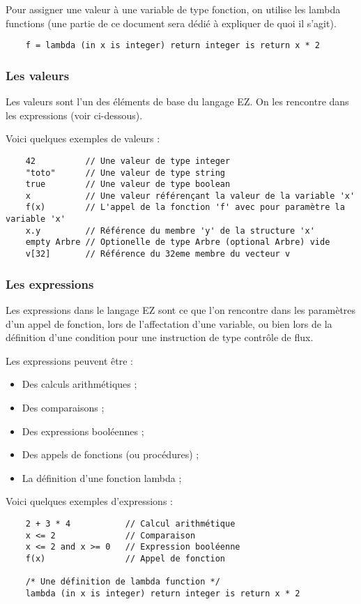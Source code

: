 Pour assigner une valeur à une variable de type fonction, on utilise les lambda
functions (une partie de ce document sera dédié à expliquer de quoi il s'agit).
\begin{verbatim}
    f = lambda (in x is integer) return integer is return x * 2
\end{verbatim}


\subsubsection{Les valeurs}

Les valeurs sont l'un des éléments de base du langage EZ. On les rencontre
dans les expressions (voir ci-dessous).

Voici quelques exemples de valeurs :
\begin{verbatim}
    42          // Une valeur de type integer
    "toto"      // Une valeur de type string
    true        // Une valeur de type boolean
    x           // Une valeur référençant la valeur de la variable 'x'
    f(x)        // L'appel de la fonction 'f' avec pour paramètre la variable 'x'
    x.y         // Référence du membre 'y' de la structure 'x'
    empty Arbre // Optionelle de type Arbre (optional Arbre) vide
    v[32]       // Référence du 32eme membre du vecteur v
\end{verbatim}


\subsubsection{Les expressions}

Les expressions dans le langage EZ sont ce que l'on rencontre dans les
paramètres d'un appel de fonction, lors de l'affectation d'une variable, ou
bien lors de la définition d'une condition pour une instruction de type
contrôle de flux.

Les expressions peuvent être :
\begin{itemize}
    \item Des calculs arithmétiques ;
    \item Des comparaisons ;
    \item Des expressions booléennes ;
    \item Des appels de fonctions (ou procédures) ;
    \item La définition d'une fonction lambda ;
\end{itemize}

Voici quelques exemples d'expressions :
\begin{verbatim}
    2 + 3 * 4           // Calcul arithmétique
    x <= 2              // Comparaison
    x <= 2 and x >= 0   // Expression booléenne
    f(x)                // Appel de fonction

    /* Une définition de lambda function */
    lambda (in x is integer) return integer is return x * 2
\end{verbatim}

